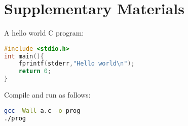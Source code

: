 \chapter[Appendix: a]{Supplementary Materials}\label{a:supps}

A hello world C program:

\begin{lstlisting}[language=c]
#include <stdio.h>
int main(){
    fprintf(stderr,"Hello world\n");
    return 0;
}
\end{lstlisting}

Compile and run as follows:

\begin{lstlisting}[language=bash]
gcc -Wall a.c -o prog
./prog
\end{lstlisting}
